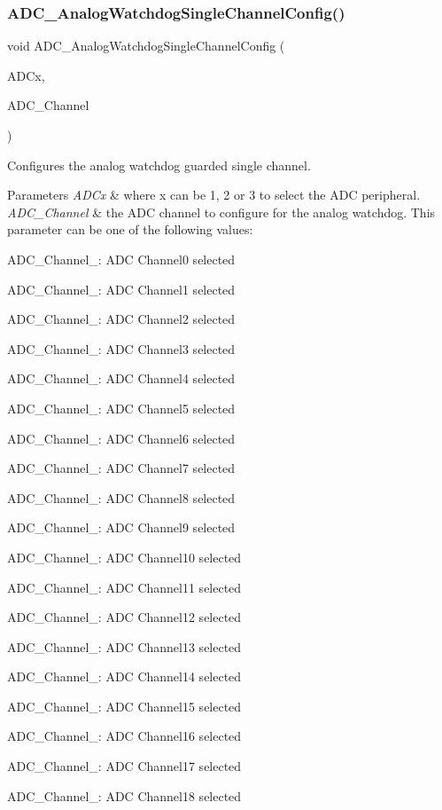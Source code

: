 \subsubsection{A\+D\+C\+\_\+\+Analog\+Watchdog\+Single\+Channel\+Config()}
{\footnotesize\ttfamily void A\+D\+C\+\_\+\+Analog\+Watchdog\+Single\+Channel\+Config (\begin{DoxyParamCaption}\item[{\textbf{ A\+D\+C\+\_\+\+Type\+Def} $\ast$}]{A\+D\+Cx,  }\item[{uint8\+\_\+t}]{A\+D\+C\+\_\+\+Channel }\end{DoxyParamCaption})}



Configures the analog watchdog guarded single channel. 


\begin{DoxyParams}{Parameters}
{\em A\+D\+Cx} & where x can be 1, 2 or 3 to select the A\+DC peripheral. \\
\hline
{\em A\+D\+C\+\_\+\+Channel} & the A\+DC channel to configure for the analog watchdog. This parameter can be one of the following values\+: \begin{DoxyItemize}
\item A\+D\+C\+\_\+\+Channel\+\_\+: A\+DC Channel0 selected \item A\+D\+C\+\_\+\+Channel\+\_\+: A\+DC Channel1 selected \item A\+D\+C\+\_\+\+Channel\+\_\+: A\+DC Channel2 selected \item A\+D\+C\+\_\+\+Channel\+\_\+: A\+DC Channel3 selected \item A\+D\+C\+\_\+\+Channel\+\_\+: A\+DC Channel4 selected \item A\+D\+C\+\_\+\+Channel\+\_\+: A\+DC Channel5 selected \item A\+D\+C\+\_\+\+Channel\+\_\+: A\+DC Channel6 selected \item A\+D\+C\+\_\+\+Channel\+\_\+: A\+DC Channel7 selected \item A\+D\+C\+\_\+\+Channel\+\_\+: A\+DC Channel8 selected \item A\+D\+C\+\_\+\+Channel\+\_\+: A\+DC Channel9 selected \item A\+D\+C\+\_\+\+Channel\+\_\+: A\+DC Channel10 selected \item A\+D\+C\+\_\+\+Channel\+\_\+: A\+DC Channel11 selected \item A\+D\+C\+\_\+\+Channel\+\_\+: A\+DC Channel12 selected \item A\+D\+C\+\_\+\+Channel\+\_\+: A\+DC Channel13 selected \item A\+D\+C\+\_\+\+Channel\+\_\+: A\+DC Channel14 selected \item A\+D\+C\+\_\+\+Channel\+\_\+: A\+DC Channel15 selected \item A\+D\+C\+\_\+\+Channel\+\_\+: A\+DC Channel16 selected \item A\+D\+C\+\_\+\+Channel\+\_\+: A\+DC Channel17 selected \item A\+D\+C\+\_\+\+Channel\+\_\+: A\+DC Channel18 selected \end{DoxyItemize}
\\
\hline
\end{DoxyParams}

